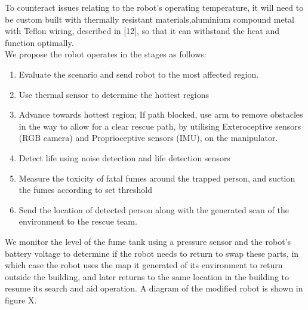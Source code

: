 To counteract issues relating to the robot’s operating temperature, it will need to be custom built with thermally resistant materials,aluminium compound metal with Teflon wiring, described in [12], so that it can withstand the heat and function optimally.\\

We propose the robot operates in the stages as follows:
\begin{enumerate}
    \item Evaluate the scenario and send robot to the most affected region.
    \item Use thermal sensor to determine the hottest regions
    \item Advance towards hottest region; If path blocked, use arm to remove obstacles in the way to allow for a clear rescue path, by utilising Exteroceptive sensors (RGB camera) and Proprioceptive sensors (IMU), on the manipulator.
    \item Detect life using noise detection and life detection sensors
    \item Measure the toxicity of fatal fumes around the trapped person, and suction the fumes according to set threshold
    \item Send the location of detected person along with the generated scan of the environment to the rescue team.
\end{enumerate}

We monitor the level of the fume tank using a pressure sensor and the robot’s battery voltage to determine if the robot needs to return to swap these parts, in which case the robot uses the map it generated of its environment to return outside the building, and later returns to the same location in the building to resume its search and aid operation. 
A diagram of the modified robot is shown in figure X.





